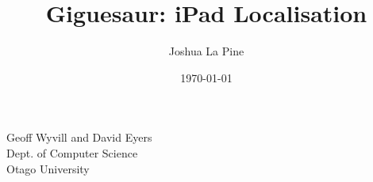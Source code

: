 \documentclass{article}
\title{Giguesaur: iPad Localisation} %
\author{Joshua La Pine} %
\date{\today} %
\begin{document}
\maketitle %

\begin{center}
\large {Geoff Wyvill and David Eyers}\\
\vspace*{1\baselineskip}
Dept. of Computer Science \\
Otago University \\

\end{center}
\newpage

\tableofcontents
\newpage

\end{document}
